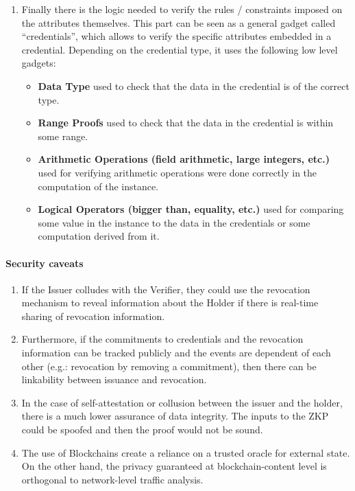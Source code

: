 \begin{enumerate}
\item Finally there is the logic needed to verify the rules / constraints imposed on the attributes themselves.
This part can be seen as a general gadget called ``credentials'', which allows to verify the specific attributes embedded in a credential. Depending on the 	credential type, it uses the following low level gadgets:	
	\begin{itemize}
	\item \textbf{Data Type} used to check that the data in the credential is of the correct type.
	\item \textbf{Range Proofs} used to check that the data in the credential is within some range.
	\item \textbf{Arithmetic Operations (field arithmetic, large integers, etc.)} used for verifying arithmetic operations were done correctly in the computation of the instance.
	\item \textbf{Logical Operators (bigger than, equality, etc.)} used for comparing some value in the instance to the data in the credentials or some computation derived from it.
	\end{itemize}
\end{enumerate}


\paragraph[:]{Security caveats}

\begin{enumerate}
	\item If the Issuer colludes with the Verifier, they could use the revocation mechanism to reveal information about the Holder if there is real-time sharing of revocation information.
	\item Furthermore, if the commitments to credentials and the revocation information can be tracked publicly and the events are dependent of each other (e.g.: revocation by removing a commitment), then there can be linkability between issuance and revocation.	
	\item In the case of self-attestation or collusion between the issuer and the holder, there is a much lower assurance of data integrity. The inputs to the ZKP could be spoofed and then the proof would not be sound.
	\item The use of Blockchains create a reliance on a trusted oracle for external state. On the other hand, the privacy guaranteed at blockchain-content level is orthogonal to network-level traffic analysis.	\loosen
\end{enumerate}



